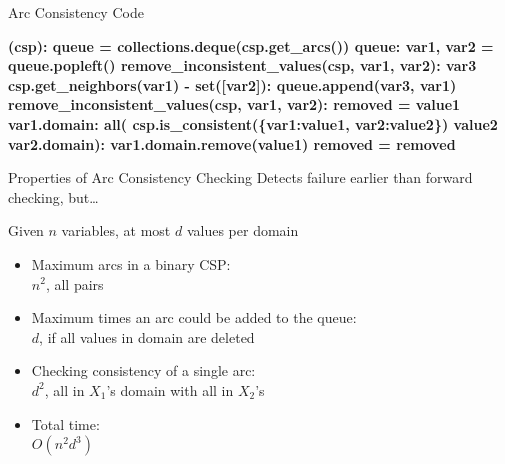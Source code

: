 \documentclass[14pt]{beamer}
\begin{document}
\begin{frame}[fragile]{Arc Consistency Code}
	\scriptsize
	\begin{semiverbatim}\bfseries
		 (csp):
		    \pause{}
		    queue = collections.deque(csp.get_arcs())
		     queue:
		        var1, var2 = queue.popleft()
		        \pause{}
		         remove_inconsistent_values(csp, var1, var2):
		             var3  csp.get_neighbors(var1) - set([var2]):
		                queue.append(var3, var1)
		\pause
		 remove_inconsistent_values(csp, var1, var2):
		    \pause{}
		    removed = 
		     value1  var1.domain:
		        \pause{}
		         all( csp.is_consistent(\{var1:value1, var2:value2\})
		                value2  var2.domain):
		            var1.domain.remove(value1)
		            removed = 
		    \pause{}
		     removed
	\end{semiverbatim}
\end{frame}
\begin{frame}{Properties of Arc Consistency Checking}
	Detects failure earlier than forward checking, but\ldots
	\begin{block}{Given $n$ variables, at most $d$ values per domain}
		\begin{itemize}
			\pause
			\item Maximum arcs in a binary CSP: \\
			      \pause \hspace{2em} $n^2$, all pairs
			\pause
			\item Maximum times an arc could be added to the queue: \\
			      \pause \hspace{2em} $d$, if all values in domain are deleted
			\pause
			\item Checking consistency of a single arc: \\
			      \pause \hspace{2em} $d^2$, all in $X_1$'s domain with all in $X_2$'s
			\pause
			\item Total time: \\
			      \pause \hspace{2em} $O(n^2d^3)$
		\end{itemize}
	\end{block}
\end{frame}
\end{document}
